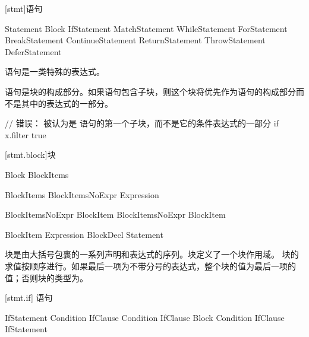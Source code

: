 
[stmt]{语句}

\begin{bnf}{Statement}
    Block \br
    IfStatement \br
    MatchStatement \br
    WhileStatement \br
    ForStatement \br
    BreakStatement \br
    ContinueStatement \br
    ReturnStatement \br
    ThrowStatement \br
    DeferStatement
\end{bnf}

\pnum
语句是一类特殊的表达式。

\pnum
语句是块的构成部分。如果语句包含子块，则这个块将优先作为语句的构成部分而不是其中的表达式的一部分。\enterexample

\begin{codeblock}
// 错误：  被认为是  语句的第一个子块，而不是它的条件表达式的一部分
if x.filter{ true }
\end{codeblock}

\exitexample

[stmt.block]{块}

\begin{bnf}{Block}
    \terminal{\{} BlockItems \terminal{\}}
\end{bnf}

\begin{bnf}{BlockItems}
    BlockItemsNoExpr Expression\bnfs
\end{bnf}

\begin{bnf}{BlockItemsNoExpr}
    BlockItem \br
    BlockItemsNoExpr BlockItem
\end{bnf}

\begin{bnf}{BlockItem}
    Expression \terminal{;} \br
    BlockDecl \br
    Statement
\end{bnf}

\pnum
块是由大括号包裹的一系列声明和表达式的序列。块定义了一个块作用域。
块的求值按顺序进行。如果最后一项为不带分号的表达式，整个块的值为最后一项的值；否则块的类型为。

[stmt.if]{ 语句}

\begin{bnf}{IfStatement}
     Condition IfClause \br
     Condition IfClause  Block \br
     Condition IfClause  IfStatement
\end{bnf}

